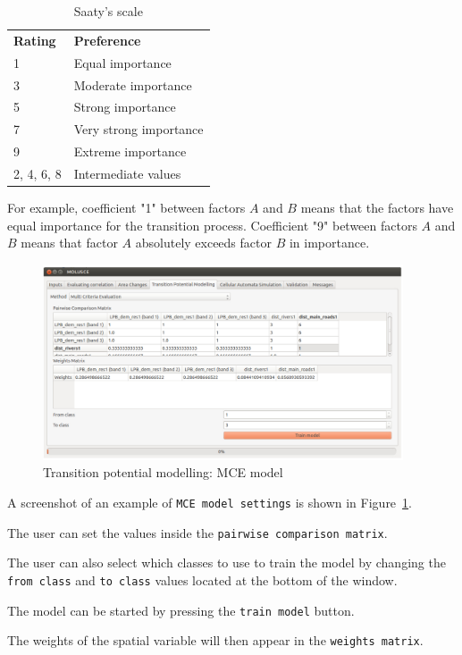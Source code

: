 \documentclass{report}
\begin{document}
\begin{table}
\centering
\caption{Saaty's scale}
\begin{tabular}{ll}
 \bf{Rating} & \bf{Preference}   \\
 1 & Equal importance  \\
 3 & Moderate importance \\ 
 5 & Strong importance \\
 7 & Very strong importance \\
 9 & Extreme importance \\
 2, 4, 6, 8 & Intermediate values 
\end{tabular}
\label{tab:saaty_scale}
\end{table}

For example, coefficient "1" between factors $A$ and $B$ means that the factors have equal importance for the transition process. 
Coefficient "9" between factors $A$ and $B$ means that factor $A$ absolutely exceeds factor $B$ in importance.

\begin{figure}[h!]
\centering
\includegraphics[width=0.95\textwidth]{img/mce_model.png}
\caption{Transition potential modelling: MCE model}
\label{fig:mce_model}
\end{figure}

A screenshot of an example of \verb+MCE model settings+ is shown in Figure~\ref{fig:mce_model}.

The user can set the values inside the \verb+pairwise comparison matrix+. 

The user can also select which classes to use to train the model by changing the \verb+from class+ 
and \verb+to class+ values located at the bottom of the window.


The model can be started by pressing the \verb+train model+ button.

The weights of the spatial variable will then appear in the \verb+weights matrix+.
\end{document}
